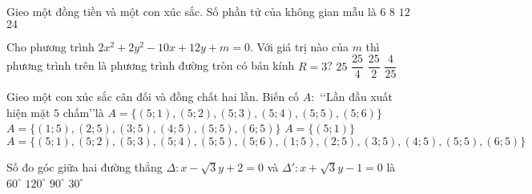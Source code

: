 \begin{ex}%
	Gieo một đồng tiền và một con xúc sắc. Số phần tử của không gian mẫu là
	\choice
	{$6$}
	{$8$}
	{\True $12$}
	{$24$}
\end{ex}
\begin{ex}%
	Cho phương trình $2x^2+2y^2-10x+12y+m=0$. Với giá trị nào của $m$ thì phương trình trên là phương trình đường tròn có bán kính $R=3$?
	\choice
	{$25$}
	{$\dfrac{25}{4}$}
	{\True $\dfrac{25}{2}$}
	{$\dfrac{4}{25}$}
\end{ex}
\begin{ex}%
	Gieo một con xúc sắc cân đối và đồng chất hai lần. Biến cố $A:$ \lq\lq Lần đầu xuất hiện mặt $5$ chấm\rq\rq là
	\choice
	{\True $A=\{(5;1),(5;2),(5;3),(5;4),(5;5),(5;6)\}$}
	{$A=\{(1;5),(2;5),(3;5),(4;5),(5;5),(6;5)\}$}
	{$A=\{(5;1)\}$}
	{$A=\{(5;1),(5;2),(5;3),(5;4),(5;5),(5;6),(1;5),(2;5),(3;5),(4;5),(5;5),(6;5)\}$}
	\loigiai{
		
	}
\end{ex}
\begin{ex}%
	Số đo góc giữa hai đường thẳng $\Delta\colon x-\sqrt{3}y+2=0$ và $\Delta'\colon x+\sqrt{3}y-1=0$ là
	\choice
	{\True $60^\circ$}
	{$120^\circ$}
	{$90^\circ$}
	{$30^\circ$}
\end{ex}
